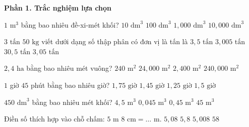 \textbf{Phần 1. Trắc nghiệm lựa chọn}

\begin{ex} %
$1\text{ m}^3$ bằng bao nhiêu đề-xi-mét khối?
\choice
{$10\text{ dm}^3$}
{$100\text{ dm}^3$}
{\True $1,000\text{ dm}^3$}
{$10,000\text{ dm}^3$}
\end{ex}

\begin{ex} %
$3\text{ tấn } 50\text{ kg}$ viết dưới dạng số thập phân có đơn vị là tấn là
\choice
{$3{,}5\text{ tấn}$}
{$3{,}005\text{ tấn}$}
{$30{,}5\text{ tấn}$}
{\True $3{,}05\text{ tấn}$}
\end{ex}

\begin{ex} %
$2{,}4\text{ ha}$ bằng bao nhiêu mét vuông?
\choice
{$240\text{ m}^2$}
{\True $24,000\text{ m}^2$}
{$2,400\text{ m}^2$}
{$240,000\text{ m}^2$}
\end{ex}

\begin{ex} %
$1$ giờ $45$ phút bằng bao nhiêu giờ?
\choice
{\True $1{,}75\text{ giờ}$}
{$1{,}45\text{ giờ}$}
{$1{,}25\text{ giờ}$}
{$1{,}5\text{ giờ}$}
\end{ex}

\begin{ex} %
$450\text{ dm}^3$ bằng bao nhiêu mét khối?
\choice
{$4{,}5\text{ m}^3$}
{$0{,}045\text{ m}^3$}
{\True $0{,}45\text{ m}^3$}
{$45\text{ m}^3$}
\end{ex}

\begin{ex} %
Điền số thích hợp vào chỗ chấm: $5\text{ m } 8\text{ cm} = \dots\text{ m}$.
\choice
{\True $5{,}08$}
{$5{,}8$}
{$5{,}008$}
{$58$}
\end{ex}


